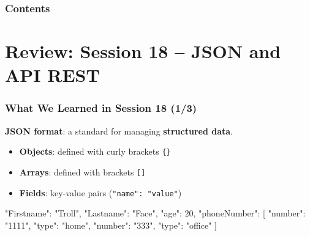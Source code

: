 \documentclass[xcolor=table]{beamer}
\title[\asignatura]{\asignatura}
\subtitle{\grado}
\author{URJC}
\institute{GSyC}
\date{Course \curso}
\begin{document}
\frame{
\maketitle
}

\begin{frame}
\frametitle{Contents}
\tableofcontents
\end{frame}


\section{Review: Session 18 -- JSON and API REST}

\begin{frame}[fragile]
\frametitle{What We Learned in Session 18 (1/3)}

\textbf{JSON format}: a standard for managing \textbf{structured data}.

\begin{itemize}
\item \textbf{Objects}: defined with curly brackets \texttt{\{\}}
\item \textbf{Arrays}: defined with brackets \texttt{[]}
\item \textbf{Fields}: key-value pairs (\texttt{"name": "value"})
\end{itemize}

\vspace{0.2cm}

\begin{python}[language={}]
{
    "Firstname": "Troll",
    "Lastname": "Face",
    "age": 20,
    "phoneNumber": [
      {"number": "1111", "type": "home"},
      {"number": "333", "type": "office"}
    ]
}
\end{python}

\end{frame}
\end{document}
